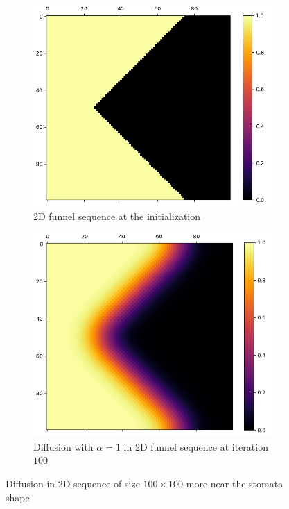 \begin{figure}[h]
    \centering
    \begin{subfigure}[b]{0.49\textwidth}
        \centering
        \includegraphics[width=\textwidth]{figures/2d_pyramid_init.png}
        \caption{2D funnel sequence at the initialization}
        \label{fig:diff_2d_fnl_init}
    \end{subfigure}
    \hfill
    \begin{subfigure}[b]{0.47\textwidth}
        \centering
        \includegraphics[width=\textwidth]{figures/2d_pyramid_100.png}
        \caption{Diffusion with $\alpha=1$ in 2D funnel sequence at iteration $100$}
        \label{fig:diff_2d_fnl_100}
    \end{subfigure}
    \caption{Diffusion in 2D sequence of size $100 \times 100$ more near the stomata shape}
    \label{fig:diff_fnl_pyr}
\end{figure}


